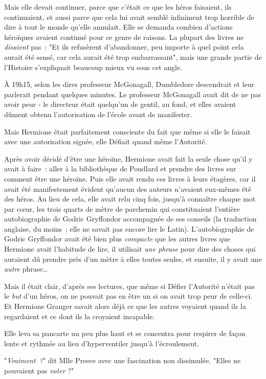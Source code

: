 Mais elle devait continuer, parce que c'était ce que les héros faisaient, ils continuaient, et aussi parce que cela lui avait semblé infiniment trop horrible de dire à tout le monde qu'elle annulait. Elle se demanda combien d'actions héroïques avaient continué pour ce genre de raisons. La plupart des livres ne \emph{disaient} pas~: "Et ils refusèrent d'abandonner, peu importe à quel point cela aurait été sensé, car cela aurait été trop embarrassant", mais une grande partie de l'Histoire s'expliquait beaucoup mieux vu sous cet angle.

À 19h15, selon les dires professeur McGonagall, Dumbledore descendrait et leur parlerait pendant quelques minutes. Le professeur McGonagall avait dit de ne pas avoir peur - le directeur était quelqu'un de gentil, au fond, et elles avaient dûment obtenu l'autorisation de l'école avant de manifester.

Mais Hermione était parfaitement consciente du fait que même si elle le faisait avec une autorisation signée, elle Défiait quand même l'Autorité.

Après avoir décidé d'être une héroïne, Hermione avait fait la seule chose qu'il y avait à faire~: aller à la bibliothèque de Poudlard et prendre des livres sur comment être une héroïne. Puis elle avait rendu ces livres à leurs étagères, car il avait été manifestement évident qu'aucun des auteurs n'avaient eux-mêmes été des héros. Au lieu de cela, elle avait relu cinq fois, jusqu'à connaître chaque mot par cœur, les trois quarts de mètre de parchemin qui constituaient l'entière autobiographie de Godric Gryffondor accompagnée de ses conseils (la traduction anglaise, du moins~; elle ne savait pas encore lire le Latin). L'autobiographie de Godric Gryffondor avait été bien plus \emph{compacte} que les autres livres que Hermione avait l'habitude de lire, il utilisait \emph{une phrase} pour dire des choses qui auraient dû prendre près d'un mètre à elles toutes seules, et ensuite, il y avait une \emph{autre} phrase…

Mais il était clair, d'après ses lectures, que même si Défier l'Autorité n'était pas le \emph{but} d'un héros, on ne pouvait pas en être un si on avait trop peur de celle-ci. Et Hermione Granger savait alors déjà ce que les autres voyaient quand ils la regardaient et ce dont ils la croyaient incapable.

Elle leva sa pancarte un peu plus haut et se concentra pour respirer de façon lente et rythmée au lieu d'hyperventiler jusqu'à l'écroulement.

"\emph{Vraiment~?}" dit Mlle Preece avec une fascination non dissimulée. "Elles ne pouvaient pas \emph{voter} ?"

